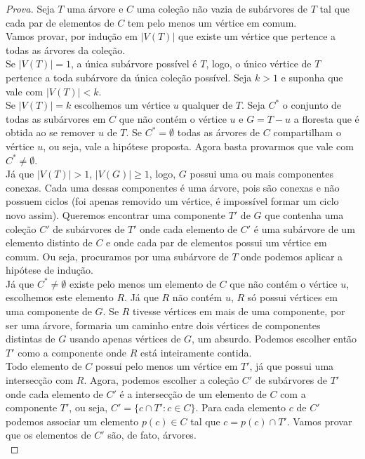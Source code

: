 \documentclass[12pt]{article}
\begin{document}
\begin{proof}[Prova]
Seja $T$ uma árvore e $C$ uma coleção não vazia de subárvores de $T$ tal que cada par de elementos de $C$ tem pelo menos um vértice em comum. \\
Vamos provar, por indução em $|V(T)|$ que existe um vértice que pertence a todas as árvores da coleção. \\
Se $|V(T)| = 1$, a única subárvore possível é $T$, logo, o único vértice de $T$ pertence a toda subárvore da única coleção possível. Seja $k > 1$ e suponha que vale com $|V(T)| < k$. \\
Se $|V(T)| = k$ escolhemos um vértice $u$ qualquer de $T$. Seja $C^*$ o conjunto de todas as subárvores em $C$ que não contém o vértice $u$ e $G = T - u$ a floresta que é obtida ao se remover $u$ de $T$. Se $C^* = \emptyset$ todas as árvores de $C$ compartilham o vértice $u$, ou seja, vale a hipótese proposta. Agora basta provarmos que vale com $C^* \neq \emptyset$. \\
Já que $|V(T)| > 1$, $|V(G)| \geq 1$, logo, $G$ possui uma ou mais componentes conexas. Cada uma dessas componentes é uma árvore, pois são conexas e não possuem ciclos (foi apenas removido um vértice, é impossível formar um ciclo novo assim). Queremos encontrar uma componente $T'$ de $G$ que contenha uma coleção $C'$ de subárvores de $T'$ onde cada elemento de $C'$ é uma subárvore de um elemento distinto de $C$ e onde cada par de elementos possui um vértice em comum. Ou seja, procuramos por uma subárvore de $T$ onde podemos aplicar a hipótese de indução. \\
Já que $C^* \neq \emptyset$ existe pelo menos um elemento de $C$ que não contém o vértice $u$, escolhemos este elemento $R$. Já que $R$ não contém $u$, $R$ só possui vértices em uma componente de $G$. Se $R$ tivesse vértices em mais de uma componente, por ser uma árvore, formaria um caminho entre dois vértices de componentes distintas de $G$ usando apenas vértices de $G$, um absurdo. Podemos escolher então $T'$ como a componente onde $R$ está inteiramente contida. \\
Todo elemento de $C$ possui pelo menos um vértice em $T'$, já que possui uma intersecção com $R$. Agora, podemos escolher a coleção $C'$ de subárvores de $T'$ onde cada elemento de $C'$ é a intersecção de um elemento de $C$ com a componente $T'$, ou seja, $C' = \{c \cap T' : c \in C\}$. Para cada elemento $c$ de $C'$ podemos associar um elemento $p(c) \in C$ tal que $c = p(c) \cap T'$. Vamos provar que os elementos de $C'$ são, de fato, árvores. \\

\end{proof}
\end{document}
